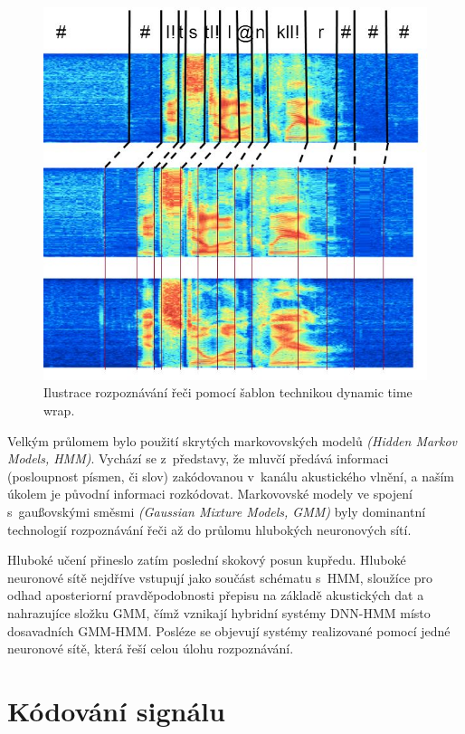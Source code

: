 \begin{figure}[htpb]
\includegraphics[scale=1]{rc/dtw.png}
\caption{
  Ilustrace rozpoznávání řeči pomocí šablon technikou dynamic time wrap.
}
\label{fig:dtw}
\end{figure}

Velkým průlomem bylo použití skrytých markovovských modelů \textit{(Hidden
Markov Models, HMM)}. Vychází se z~představy, že mluvčí předává informaci
(posloupnost písmen, či slov) zakódovanou v~kanálu akustického vlnění, a naším
úkolem je původní informaci rozkódovat. Markovovské modely ve spojení
s~gaußovskými směsmi \textit{(Gaussian Mixture Models, GMM)} byly dominantní
technologií rozpoznávání řeči až do průlomu hlubokých neuronových sítí.

Hluboké učení přineslo zatím poslední skokový posun kupředu. Hluboké neuronové
sítě nejdříve vstupují jako součást schématu s~HMM, sloužíce pro odhad
aposteriorní pravděpodobnosti přepisu na základě akustických dat a nahrazujíce
složku GMM, čímž vznikají hybridní systémy DNN-HMM místo dosavadních GMM-HMM.
Posléze se objevují systémy realizované pomocí jedné neuronové sítě, která řeší
celou úlohu rozpoznávání.

\section{Kódování signálu}


